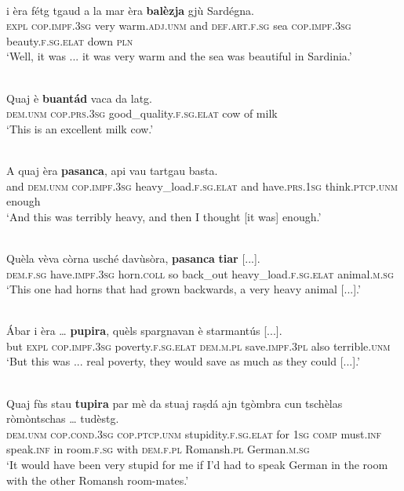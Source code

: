  
\ea\label{}
\\
	\gll  [...] i èra fétg tgaud a la mar èra \textbf{balèzja} gjù Sardégna.\\
{} \textsc{expl} \textsc{cop.impf.3sg} very warm.\textsc{adj.unm} and \textsc{def.art.f.sg} sea \textsc{cop.impf.3sg} beauty.\textsc{f.sg.elat} down \textsc{pln}\\
\glt `Well, it was ... it was very warm and the sea was beautiful in Sardinia.'
\z

\ea\label{}
\\
\gll  Quaj è \textbf{buantád} vaca da latg. \\
\textsc{dem.unm} \textsc{cop.prs.3sg} good\_quality.\textsc{f.sg.elat} cow of milk\\
\glt `This is an excellent milk cow.'
\z

\ea
\label{}
\\
\gll  A quaj èra \textbf{pasanca}, api vau tartgau basta.\\
and \textsc{dem.unm} \textsc{cop.impf.3sg} heavy\_load.\textsc{f.sg.elat} and have.\textsc{prs.1sg} think.\textsc{ptcp.unm} enough  \\
\glt `And this was terribly heavy, and then I thought [it was] enough.'
\z

\ea
\label{}
\\
	\gll  Quèla vèva còrna usché davùsòra, \textbf{pasanca} \textbf{tiar} [...].  \\
\textsc{dem.f.sg} have.\textsc{impf.3sg} horn.\textsc{coll} so back\_out heavy\_load.\textsc{f.sg.elat} animal.\textsc{m.sg} \\
\glt `This one had horns that had grown backwards, a very heavy animal [...].'
\z

\ea\label{}
\\
\gll   Ábar i èra … \textbf{pupira}, quèls spargnavan è starmantús [...].\\
but \textsc{expl}  \textsc{cop.impf.3sg} poverty.\textsc{f.sg.elat} {} \textsc{dem.m.pl} save.\textsc{impf.3pl} also terrible.\textsc{unm}\\
\glt `But this was ... real poverty, they would save as much as they could [...].'
\z

\ea
\label{}
\\
\gll    Quaj fùs stau \textbf{tupira} par mè da stuaj raṣdá ajn tgòmbra cun tschèlas ròmòntschas … tudèstg.\\
\textsc{dem.unm} \textsc{cop.cond.3sg} \textsc{cop.ptcp.unm} stupidity.\textsc{f.sg.elat}  for \textsc{1sg} \textsc{comp} must.\textsc{inf} speak.\textsc{inf} in room.\textsc{f.sg} with \textsc{dem.f.pl} Romansh.\textsc{pl} {} German.\textsc{m.sg}\\
\glt `It would have been very stupid for me if I'd had to speak German in the room with the other Romansh room-mates.'
\z

